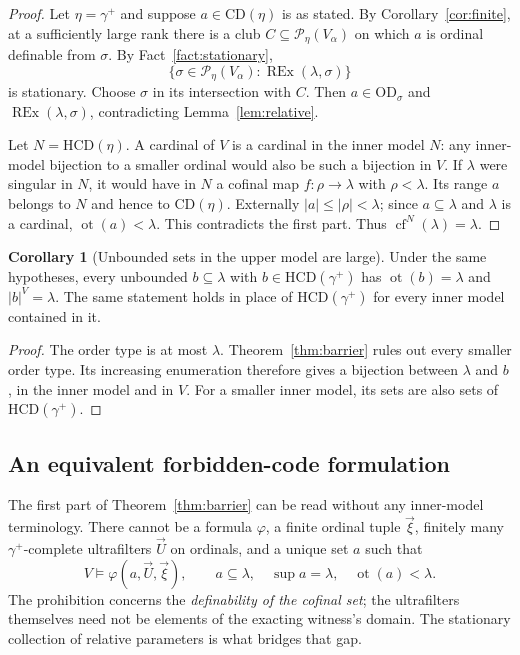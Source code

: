 \documentclass[11pt,letterpaper]{article}
\theoremstyle{definition}
\newtheorem{corollary}[definition]{Corollary}
\newcommand{\OD}{\mathrm{OD}}
\newcommand{\cf}{\operatorname{cf}}
\newcommand{\ot}{\operatorname{ot}}
\newcommand{\CD}{\mathrm{CD}}
\newcommand{\HCD}{\mathrm{HCD}}
\newcommand{\REx}{\operatorname{REx}}
\newcommand{\Pow}{\mathcal P}
\begin{document}
\begin{proof}
Let $\eta=\gamma^+$ and suppose $a\in\CD(\eta)$ is as stated.
By Corollary~\ref{cor:finite}, at a sufficiently large rank there is a club
$C\subseteq\Pow_\eta(V_\alpha)$ on which $a$ is ordinal definable from
$\sigma$. By Fact~\ref{fact:stationary},
\[
 \{\sigma\in\Pow_\eta(V_\alpha):\REx(\lambda,\sigma)\}
\]
is stationary. Choose $\sigma$ in its intersection with $C$.
Then $a\in\OD_\sigma$ and $\REx(\lambda,\sigma)$, contradicting
Lemma~\ref{lem:relative}.

Let $N=\HCD(\eta)$. A cardinal of $V$ is a cardinal in the inner model $N$:
any inner-model bijection to a smaller ordinal would also be such a bijection
in $V$. If $\lambda$ were singular in $N$, it would have in $N$ a cofinal map
$f:\rho\to\lambda$ with $\rho<\lambda$. Its range $a$ belongs to $N$ and hence
to $\CD(\eta)$. Externally $|a|\leq|\rho|<\lambda$; since $a\subseteq\lambda$
and $\lambda$ is a cardinal, $\ot(a)<\lambda$. This contradicts the first part.
Thus $\cf^N(\lambda)=\lambda$.
\end{proof}

\begin{corollary}[Unbounded sets in the upper model are large]\label{cor:large}
Under the same hypotheses, every unbounded $b\subseteq\lambda$ with
$b\in\HCD(\gamma^+)$ has $\ot(b)=\lambda$ and $|b|^V=\lambda$.
The same statement holds in place of $\HCD(\gamma^+)$ for every inner model
contained in it.
\end{corollary}

\begin{proof}
The order type is at most $\lambda$. Theorem~\ref{thm:barrier} rules out every
smaller order type. Its increasing enumeration therefore gives a bijection
between $\lambda$ and $b$, in the inner model and in $V$.
For a smaller inner model, its sets are also sets of $\HCD(\gamma^+)$.
\end{proof}

\subsection{An equivalent forbidden-code formulation}

The first part of Theorem~\ref{thm:barrier} can be read without any inner-model
terminology. There cannot be a formula $\varphi$, a finite ordinal tuple
$\vec\xi$, finitely many $\gamma^+$-complete ultrafilters $\vec U$ on ordinals,
and a unique set $a$ such that
\[
 V\models\varphi(a,\vec U,\vec\xi),\qquad
 a\subseteq\lambda,\quad\sup a=\lambda,\quad\ot(a)<\lambda.
\]
The prohibition concerns the \emph{definability of the cofinal set}; the
ultrafilters themselves need not be elements of the exacting witness's domain.
The stationary collection of relative parameters is what bridges that gap.
\end{document}
